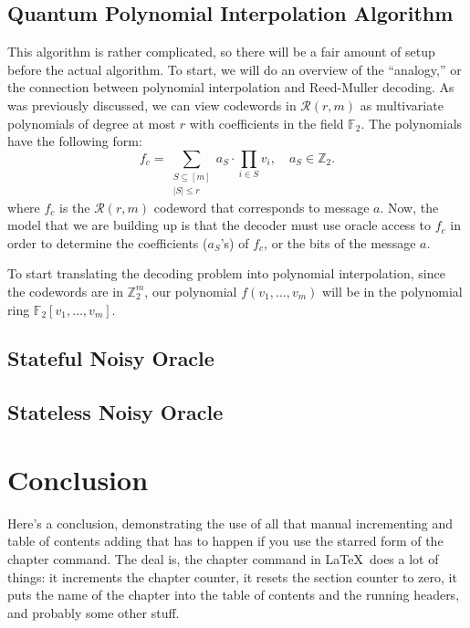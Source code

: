 \documentclass[12pt,twoside]{reedthesis}
\theoremstyle{definition}
\newcommand{\Z}{\mathbb{Z}}
\newcommand{\F}{\mathbb{F}}
\begin{document}
\section{Quantum Polynomial Interpolation Algorithm}
This algorithm is rather complicated, so there will be a fair amount of setup before the actual algorithm. To start, we will do an overview of the ``analogy,'' or the connection between polynomial interpolation and Reed-Muller decoding. As was previously discussed, we can view codewords in $\mathscr{R}(r,m)$ as multivariate polynomials of degree at most $r$ with coefficients in the field $\F_2$. The polynomials have the following form:
\begin{equation*}
f_c = \sum_{\substack{S \subseteq [m] \\ \lvert S \rvert \leq r}} a_S \cdot \prod_{i \in S} v_i,  \quad a_S \in \Z_2.
\end{equation*}
where $f_c$ is the $\mathscr{R}(r,m)$ codeword that corresponds to message $a$. Now, the model that we are building up is that the decoder must use oracle access to $f_c$ in order to determine the coefficients ($a_S$'s) of $f_c$, or the bits of the message $a$.



To start translating the decoding problem into polynomial interpolation, since the codewords are in $\Z_2^m$, our polynomial $f(v_1, \ldots, v_m)$ will be in the polynomial ring $\F_2[v_1, \ldots, v_m]$. 




\section{Stateful Noisy Oracle}
\section{Stateless Noisy Oracle}

\chapter*{Conclusion}
	\setcounter{chapter}{6}
	\setcounter{section}{0}
	
Here's a conclusion, demonstrating the use of all that manual incrementing and table of contents adding that has to happen if you use the starred form of the chapter command. The deal is, the chapter command in \LaTeX\ does a lot of things: it increments the chapter counter, it resets the section counter to zero, it puts the name of the chapter into the table of contents and the running headers, and probably some other stuff. 
\end{document}
